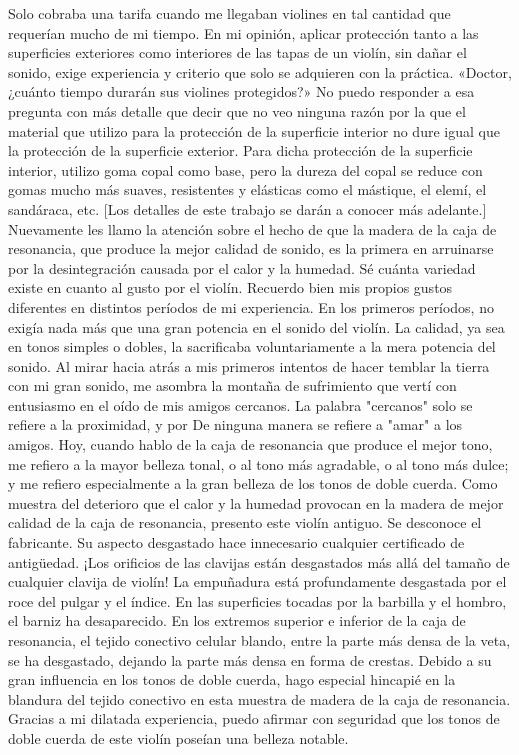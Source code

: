 Solo cobraba una tarifa cuando me llegaban violines en tal cantidad que requerían mucho de mi tiempo.
En mi opinión, aplicar protección tanto a las superficies exteriores como interiores de las tapas de un violín, sin dañar el sonido, exige experiencia y criterio que solo se adquieren con la práctica.
«Doctor, ¿cuánto tiempo durarán sus violines protegidos?» No puedo responder a esa pregunta con más detalle que decir que no veo ninguna razón por la que el material que utilizo para la protección de la superficie interior no dure igual que la protección de la superficie exterior. Para dicha protección de la superficie interior, utilizo goma copal como base, pero la dureza del copal se reduce con gomas mucho más suaves, resistentes y elásticas como el mástique, el elemí, el sandáraca, etc.
[Los detalles de este trabajo se darán a conocer más adelante.]
Nuevamente les llamo la atención sobre el hecho de que la madera de la caja de resonancia, que produce la mejor calidad de sonido, es la primera en arruinarse por la desintegración causada por el calor y la humedad. Sé cuánta variedad existe en cuanto al gusto por el violín. Recuerdo bien mis propios gustos diferentes en distintos períodos de mi experiencia. En los primeros períodos, no exigía nada más que una gran potencia en el sonido del violín. La calidad, ya sea en tonos simples o dobles, la sacrificaba voluntariamente a la mera potencia del sonido. Al mirar hacia atrás a mis primeros intentos de hacer temblar la tierra con mi gran sonido, me asombra la montaña de sufrimiento que vertí con entusiasmo en el oído de mis amigos cercanos. La palabra "cercanos" solo se refiere a la proximidad, y por
De ninguna manera se refiere a "amar" a los amigos. Hoy, cuando hablo de la caja de resonancia que produce el mejor tono, me refiero a la mayor belleza tonal, o al tono más agradable, o al tono más dulce; y me refiero especialmente a la gran belleza de los tonos de doble cuerda.
Como muestra del deterioro que el calor y la humedad provocan en la madera de mejor calidad de la caja de resonancia, presento este violín antiguo. Se desconoce el fabricante. Su aspecto desgastado hace innecesario cualquier certificado de antigüedad. ¡Los orificios de las clavijas están desgastados más allá del tamaño de cualquier clavija de violín! La empuñadura está profundamente desgastada por el roce del pulgar y el índice. En las superficies tocadas por la barbilla y el hombro, el barniz ha desaparecido. En los extremos superior e inferior de la caja de resonancia, el tejido conectivo celular blando, entre la parte más densa de la veta, se ha desgastado, dejando la parte más densa en forma de crestas. Debido a su gran influencia en los tonos de doble cuerda, hago especial hincapié en la blandura del tejido conectivo en esta muestra de madera de la caja de resonancia. Gracias a mi dilatada experiencia, puedo afirmar con seguridad que los tonos de doble cuerda de este violín poseían una belleza notable.
